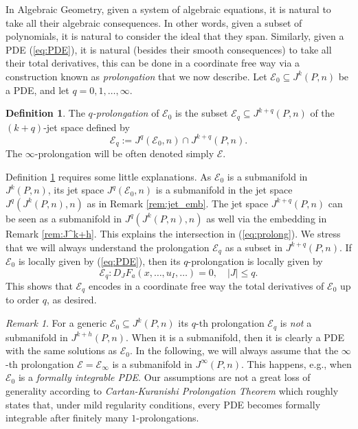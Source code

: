 \documentclass{conm-p-l}
\theoremstyle{definition}
\newtheorem{definition}[theorem]{Definition}
\theoremstyle{remark}
\newtheorem{remark}[theorem]{Remark}
\numberwithin{equation}{section}
\begin{document}
In Algebraic Geometry, given a system of algebraic equations, it is natural to take all their algebraic consequences. In other words, given a subset of polynomials, it is natural to consider the ideal that they span. Similarly, given a PDE (\ref{eq:PDE}), it is natural (besides their smooth consequences) to take all their total derivatives, this can be done in a coordinate free way via a construction known as \emph{prolongation} that we now describe. Let $\mathscr E_0 \subseteq J^k (P, n)$ be a PDE, and let $q = 0, 1, \ldots, \infty$.

\begin{definition}\label{def:prolong}
The \emph{$q$-prolongation} of $\mathscr E_0$ is the subset $\mathscr E_q \subseteq J^{k+q} (P, n)$ of the $(k+q)$-jet space defined by
\begin{equation}\label{eq:prolong}
\mathscr E_q := J^q (\mathscr E_0, n) \cap J^{k+q} (P, n).
\end{equation}  
The $\infty$-prolongation will be often denoted simply $\mathscr E$.
\end{definition}

Definition \ref{def:prolong} requires some little explanations. As $\mathscr E_0$ is a submanifold in $J^k (P, n)$, its jet space $J^q (\mathscr E_0, n)$ is a submanifold in the jet space $J^q (J^k (P, n), n)$ as in Remark \ref{rem:jet_emb}. The jet space $J^{k+q} (P, n)$ can be seen as a submanifold in $J^q (J^k (P, n), n)$ as well via the embedding in Remark \ref{rem:J^k+h}. This explains the intersection in (\ref{eq:prolong}). We stress that we will always understand the prolongation $\mathscr E_q$ as a subset in $J^{k+q} (P, n)$. If $\mathscr E_0$ is locally given by (\ref{eq:PDE}), then its $q$-prolongation is locally given by
\[
\mathscr E_q : D_J F_a (x, \ldots, u_I, \ldots) = 0, \quad |J| \leq q.
\]
This shows that $\mathscr E_q$ encodes in a coordinate free way the total derivatives of $\mathscr E_0$ up to order $q$, as desired.

\begin{remark}
For a generic $\mathscr E_0 \subseteq J^k (P, n)$ its $q$-th prolongation $\mathscr E_q$ is \emph{not} a submanifold in $J^{k + h} (P, n)$. When it is a submanifold, then it is clearly a PDE with the same solutions as $\mathscr E_0$. In the following, we will always assume that the $\infty$-th prolongation $\mathscr E = \mathscr E_\infty$ is a submanifold in $J^\infty (P, n)$. This happens, e.g., when $\mathscr E_0$ is a \emph{formally integrable PDE}. Our assumptions are not a great loss of generality according to \emph{Cartan-Kuranishi Prolongation Theorem} which roughly states that, under mild regularity conditions, every PDE becomes formally integrable after finitely many $1$-prolongations.
\end{remark}
\end{document}
